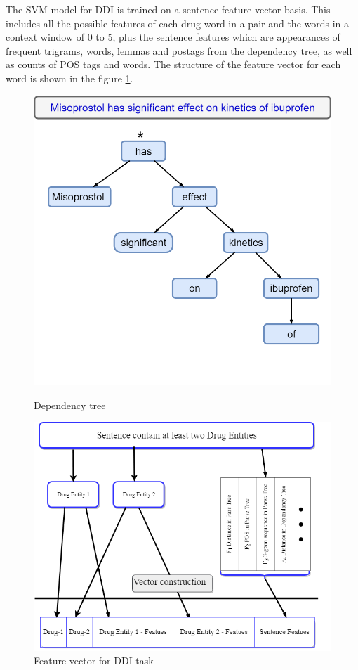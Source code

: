 The SVM model for DDI is trained on a sentence feature vector basis. This includes all the possible features of each drug word in a pair and the words in a context window of 0 to 5, plus the sentence features which are appearances of frequent trigrams, words, lemmas and postags from the dependency tree, as well as counts of POS tags and words. The structure of the feature vector for each word is shown in the figure \ref{fig:ddisvm}.




\begin{figure}[H]
%
  \centering
  \includegraphics[scale=0.25]{tree.png}
  \caption{Dependency tree }\label{fig:deptree}
\endminipage\hfill
{}
    \includegraphics[width=\linewidth]{DDI.png}
  \caption{Feature vector for DDI task}\label{fig:ddisvm}
\endminipage
\end{figure}












